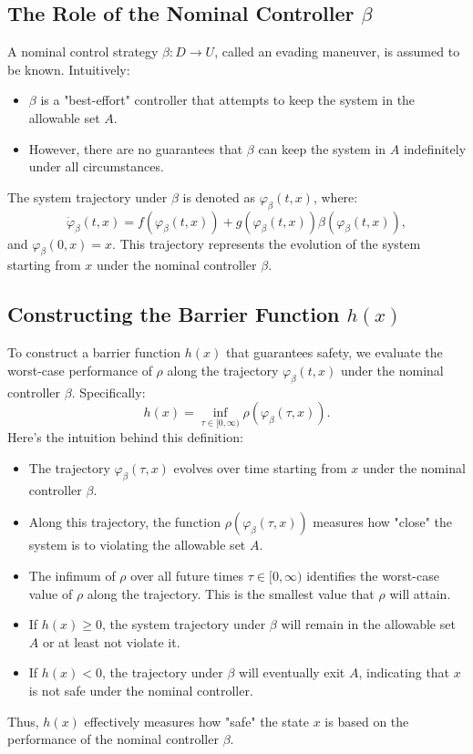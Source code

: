 \documentclass[12pt]{article}
\begin{document}
\subsection{The Role of the Nominal Controller \( \beta \)}
A nominal control strategy \( \beta : D \to U \), called an evading maneuver, is assumed to be known. Intuitively:
\begin{itemize}
    \item \( \beta \) is a "best-effort" controller that attempts to keep the system in the allowable set \( A \).
    \item However, there are no guarantees that \( \beta \) can keep the system in \( A \) indefinitely under all circumstances.
\end{itemize}
The system trajectory under \( \beta \) is denoted as \( \varphi_\beta(t, x) \), where:
\[
\dot{\varphi}_\beta(t, x) = f(\varphi_\beta(t, x)) + g(\varphi_\beta(t, x)) \beta(\varphi_\beta(t, x)),
\]
and \( \varphi_\beta(0, x) = x \). This trajectory represents the evolution of the system starting from \( x \) under the nominal controller \( \beta \).

\subsection{Constructing the Barrier Function \( h(x) \)}
To construct a barrier function \( h(x) \) that guarantees safety, we evaluate the worst-case performance of \( \rho \) along the trajectory \( \varphi_\beta(t, x) \) under the nominal controller \( \beta \). Specifically:
\[
h(x) = \inf_{\tau \in [0, \infty)} \rho(\varphi_\beta(\tau, x)).
\]
Here’s the intuition behind this definition:
\begin{itemize}
    \item The trajectory \( \varphi_\beta(\tau, x) \) evolves over time starting from \( x \) under the nominal controller \( \beta \).
    \item Along this trajectory, the function \( \rho(\varphi_\beta(\tau, x)) \) measures how "close" the system is to violating the allowable set \( A \).
    \item The infimum of \( \rho \) over all future times \( \tau \in [0, \infty) \) identifies the worst-case value of \( \rho \) along the trajectory. This is the smallest value that \( \rho \) will attain.
    \item If \( h(x) \geq 0 \), the system trajectory under \( \beta \) will remain in the allowable set \( A \) or at least not violate it.
    \item If \( h(x) < 0 \), the trajectory under \( \beta \) will eventually exit \( A \), indicating that \( x \) is not safe under the nominal controller.
\end{itemize}
Thus, \( h(x) \) effectively measures how "safe" the state \( x \) is based on the performance of the nominal controller \( \beta \).
\end{document}

